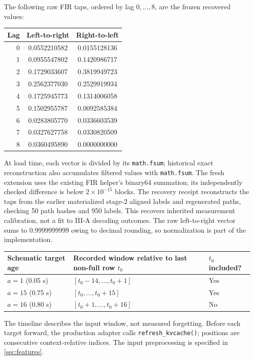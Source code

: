 \documentclass{article}
\begin{document}
The following raw FIR taps, ordered by lag $0,\ldots,8$, are the frozen recovered values:
\begin{center}
\small
\begin{tabular}{rcc}
\toprule
Lag & Left-to-right & Right-to-left\\
\midrule
0&0.0552210582&0.0155128136\\
1&0.0955547802&0.1420986717\\
2&0.1729033607&0.3819949723\\
3&0.2562377030&0.2529919934\\
4&0.1725945773&0.1314006058\\
5&0.1502955787&0.0092585384\\
6&0.0283805770&0.0336603539\\
7&0.0327627758&0.0330820509\\
8&0.0360495890&0.0000000000\\
\bottomrule
\end{tabular}
\end{center}
At load time, each vector is divided by its \texttt{math.fsum}; historical exact reconstruction also accumulates filtered values with \texttt{math.fsum}. The fresh extension uses the existing FIR helper's binary64 summation; its independently checked difference is below $2\times10^{-15}$ blocks. The recovery receipt reconstructs the taps from the earlier materialized stage-2 aligned labels and regenerated paths, checking 50 path hashes and 950 labels. This recovers inherited measurement calibration, not a fit to III-A decoding outcomes. The raw left-to-right vector sums to 0.9999999999 owing to decimal rounding, so normalization is part of the implementation.


\begin{center}
\small
\begin{tabular}{lll}
\toprule
Schematic target age & Recorded window relative to last non-full row $t_0$ & $t_0$ included?\\
\midrule
$a=1$ (0.05 s)&$[t_0-14,\ldots,t_0+1]$&Yes\\
$a=15$ (0.75 s)&$[t_0,\ldots,t_0+15]$&Yes\\
$a=16$ (0.80 s)&$[t_0+1,\ldots,t_0+16]$&No\\
\bottomrule
\end{tabular}
\end{center}

The timeline describes the input window, not measured forgetting. Before each target forward, the production adapter calls \texttt{refresh\_kvcache()}; positions are consecutive context-relative indices. The input preprocessing is specified in \autoref{sec:features}.
\end{document}
